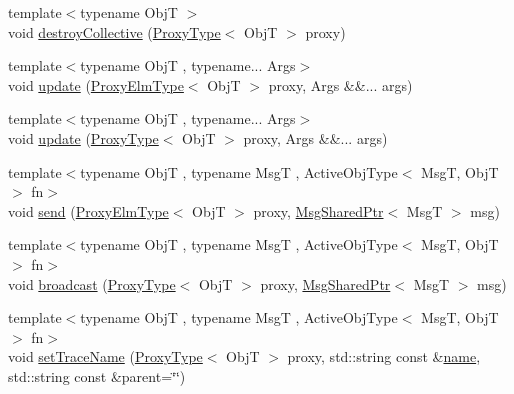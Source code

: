 \begin{DoxyCompactItemize}
\item 
{\footnotesize template$<$typename ObjT $>$ }\\void \hyperlink{structvt_1_1objgroup_1_1_obj_group_manager_ad02bff10088a4f8e453cf24bd832308c}{destroy\+Collective} (\hyperlink{structvt_1_1objgroup_1_1_obj_group_manager_aea65eef52f240a52210132eef5ce591f}{Proxy\+Type}$<$ ObjT $>$ proxy)
\item 
{\footnotesize template$<$typename ObjT , typename... Args$>$ }\\void \hyperlink{structvt_1_1objgroup_1_1_obj_group_manager_abd0f61b0578a268a27420f2c38e3b12d}{update} (\hyperlink{structvt_1_1objgroup_1_1_obj_group_manager_adba6c8ecb0f4c30e719f1abb995cfc9b}{Proxy\+Elm\+Type}$<$ ObjT $>$ proxy, Args \&\&... args)
\item 
{\footnotesize template$<$typename ObjT , typename... Args$>$ }\\void \hyperlink{structvt_1_1objgroup_1_1_obj_group_manager_a36d8749cf4f42e6b912159e9b4f959d6}{update} (\hyperlink{structvt_1_1objgroup_1_1_obj_group_manager_aea65eef52f240a52210132eef5ce591f}{Proxy\+Type}$<$ ObjT $>$ proxy, Args \&\&... args)
\item 
{\footnotesize template$<$typename ObjT , typename MsgT , Active\+Obj\+Type$<$ Msg\+T, Obj\+T $>$ fn$>$ }\\void \hyperlink{structvt_1_1objgroup_1_1_obj_group_manager_a4b45c347778fda185d97b4c6af4ec58e}{send} (\hyperlink{structvt_1_1objgroup_1_1_obj_group_manager_adba6c8ecb0f4c30e719f1abb995cfc9b}{Proxy\+Elm\+Type}$<$ ObjT $>$ proxy, \hyperlink{namespacevt_ab2b3d506ec8e8d1540aede826d84a239}{Msg\+Shared\+Ptr}$<$ MsgT $>$ msg)
\item 
{\footnotesize template$<$typename ObjT , typename MsgT , Active\+Obj\+Type$<$ Msg\+T, Obj\+T $>$ fn$>$ }\\void \hyperlink{structvt_1_1objgroup_1_1_obj_group_manager_a11a5b325363050d55b7428c84bcaa24b}{broadcast} (\hyperlink{structvt_1_1objgroup_1_1_obj_group_manager_aea65eef52f240a52210132eef5ce591f}{Proxy\+Type}$<$ ObjT $>$ proxy, \hyperlink{namespacevt_ab2b3d506ec8e8d1540aede826d84a239}{Msg\+Shared\+Ptr}$<$ MsgT $>$ msg)
\item 
{\footnotesize template$<$typename ObjT , typename MsgT , Active\+Obj\+Type$<$ Msg\+T, Obj\+T $>$ fn$>$ }\\void \hyperlink{structvt_1_1objgroup_1_1_obj_group_manager_a922a82ded79fdefb5fd7de60bde77aad}{set\+Trace\+Name} (\hyperlink{structvt_1_1objgroup_1_1_obj_group_manager_aea65eef52f240a52210132eef5ce591f}{Proxy\+Type}$<$ ObjT $>$ proxy, std\+::string const \&\hyperlink{structvt_1_1objgroup_1_1_obj_group_manager_a92c0b07c2d90063c40087f625880cca3}{name}, std\+::string const \&parent=\char`\"{}\char`\"{})

\end{DoxyCompactItemize}
